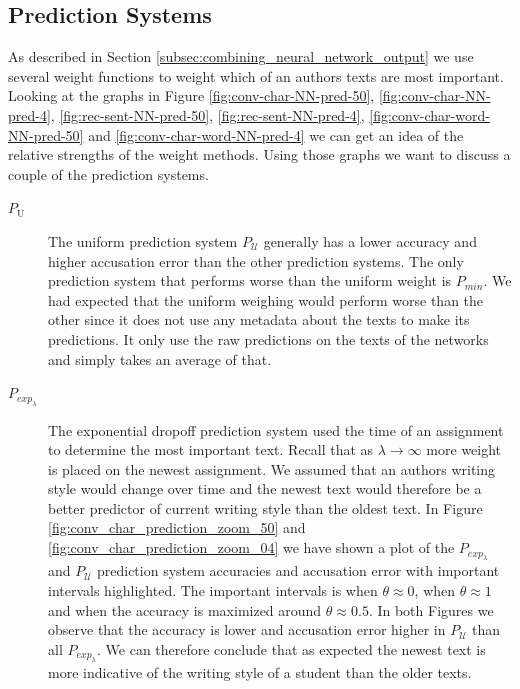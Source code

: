 \subsection{Prediction Systems}

As described in Section \ref{subsec:combining_neural_network_output} we
use several weight functions to weight which of an authors texts are most
important. Looking at the graphs in Figure \ref{fig:conv-char-NN-pred-50},
\ref{fig:conv-char-NN-pred-4}, \ref{fig:rec-sent-NN-pred-50},
\ref{fig:rec-sent-NN-pred-4}, \ref{fig:conv-char-word-NN-pred-50} and
\ref{fig:conv-char-word-NN-pred-4} we can get an idea of the relative strengths
of the weight methods. Using those graphs we want to discuss a couple of the
prediction systems.

\begin{description}

    \item[$P_\mathrm{U}$]

        The uniform prediction system $P_\mathcal{U}$ generally has a lower
        accuracy and higher accusation error than the other prediction systems.
        The only prediction system that performs worse than the uniform weight
        is $P_{min}$. We had expected that the uniform weighing would perform
        worse than the other since it does not use any metadata about the texts
        to make its predictions. It only use the raw predictions on the texts of
        the networks and simply takes an average of that.

    \item[$P_{exp_\lambda}$]

        The exponential dropoff prediction system used the time of an
        assignment to determine the most important text. Recall that
        as $\lambda \rightarrow \infty$ more weight is placed on the
        newest assignment. We assumed that an authors writing style
        would change over time and the newest text would therefore be
        a better predictor of current writing style than the oldest
        text. In Figure \ref{fig:conv_char_prediction_zoom_50} and
        \ref{fig:conv_char_prediction_zoom_04} we have shown a plot of the
        $P_{exp_\lambda}$ and $P_\mathcal{U}$ prediction system accuracies and
        accusation error with important intervals highlighted. The important
        intervals is when $\theta \approx 0$, when $\theta \approx 1$ and when
        the accuracy is maximized around $\theta \approx 0.5$. In both Figures
        we observe that the accuracy is lower and accusation error higher in
        $P_\mathcal{U}$ than all $P_{exp_\lambda}$. We can therefore conclude
        that as expected the newest text is more indicative of the writing style
        of a student than the older texts.


\end{description}

